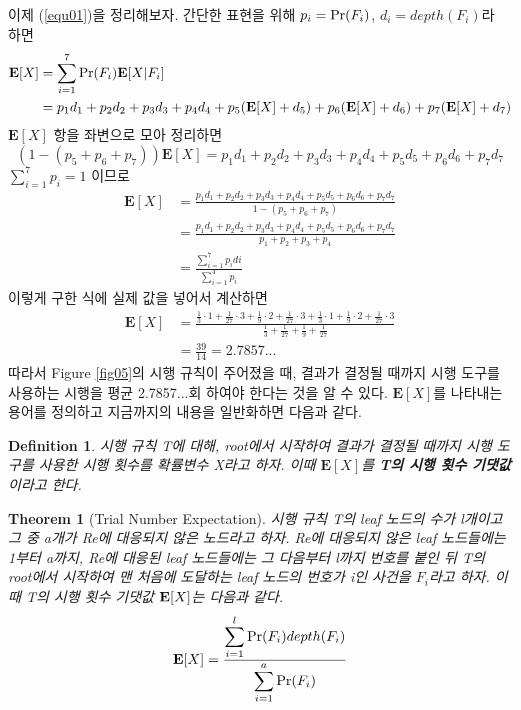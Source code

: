 \documentclass[11pt]{article}
\newtheorem*{definition}{Definition}
\newtheorem{theorem}{Theorem}
\begin{document}
\noindent 이제 (\ref{equ01})을 정리해보자. 간단한 표현을 위해 $p_{i} = \textnormal{Pr}(F_{i})$, $d_{i} = depth(F_{i})$라 하면
\[
\begin{split}
\textbf{E}[X] & = \sum_{i=1}^7 \textnormal{Pr}(F_{i}) \textbf{E}[X|F_{i}]\\
& = p_{1}d_{1} + p_{2}d_{2} + p_{3}d_{3} + p_{4}d_{4} + p_{5}(\textbf{E}[X] + d_{5}) + p_{6}(\textbf{E}[X] + d_{6}) + p_{7}(\textbf{E}[X] + d_{7})
\end{split}
\]
$\textbf{E}[X]$ 항을 좌변으로 모아 정리하면
\[(1 - (p_{5}+p_{6}+p_{7}))\textbf{E}[X] = p_{1}d_{1} + p_{2}d_{2} + p_{3}d_{3} + p_{4}d_{4} + p_{5}d_{5} + p_{6}d_{6} + p_{7}d_{7}\]
\noindent $\displaystyle \sum_{i=1}^7 p_{i} = 1$ 이므로
\[
\begin{split}
\textbf{E}[X] & = \frac{p_{1}d_{1} + p_{2}d_{2} + p_{3}d_{3} + p_{4}d_{4} + p_{5}d_{5} + p_{6}d_{6} + p_{7}d_{7}}{1 - (p_{5}+p_{6}+p_{7})}\\
& = \frac{p_{1}d_{1} + p_{2}d_{2} + p_{3}d_{3} + p_{4}d_{4} + p_{5}d_{5} + p_{6}d_{6} + p_{7}d_{7}}{p_{1}+p_{2}+p_{3}+p_{4}}\\
& = \frac{\displaystyle \sum_{i=1}^{7} p_{i}d{i}}{\displaystyle \sum_{i=1}^{4} p_{i}}
\end{split}
\]
이렇게 구한 식에 실제 값을 넣어서 계산하면
\[
\begin{split}
\textbf{E}[X] & = \frac{\frac{1}{3} \cdot 1 + \frac{1}{27} \cdot 3 + \frac{1}{9} \cdot 2 + \frac{1}{27} \cdot 3 + \frac{1}{3} \cdot 1 + \frac{1}{9} \cdot 2 + \frac{1}{27} \cdot 3}{\frac{1}{3} + \frac{1}{27} + \frac{1}{9} + \frac{1}{27}} \\
& = \frac{39}{14} = 2.7857...
\end{split}
\]
따라서 Figure \ref{fig05}의 시행 규칙이 주어졌을 때, 결과가 결정될 때까지 시행 도구를 사용하는 시행을 평균 2.7857...회 하여야 한다는 것을 알 수 있다. $\textbf{E}[X]$를 나타내는 용어를 정의하고 지금까지의 내용을 일반화하면 다음과 같다.

\singlespacing
\begin{definition}
시행 규칙 T에 대해, root에서 시작하여 결과가 결정될 때까지 시행 도구를 사용한 시행 횟수를 확률변수 X라고 하자. 이때 $\textbf{E}[X]$를 \textbf{T의 시행 횟수 기댓값}이라고 한다.
\end{definition}
\doublespacing

\singlespacing
\begin{theorem}[Trial Number Expectation]
시행 규칙 T의 leaf 노드의 수가 l개이고 그 중 a개가 Re에 대응되지 않은 노드라고 하자. Re에 대응되지 않은 leaf 노드들에는 1부터 a까지, Re에 대응된 leaf 노드들에는 그 다음부터 l까지 번호를 붙인 뒤 T의 root에서 시작하여 맨 처음에 도달하는 leaf 노드의 번호가 i인 사건을 $F_{i}$라고 하자. 이때 T의 시행 횟수 기댓값 $\textnormal{\textbf{E}}[X]$는 다음과 같다.
\[\textnormal{\textbf{E}}[X] = \frac{\displaystyle \sum_{i=1}^{l} \textnormal{Pr}(F_{i})depth(F_{i})}{\displaystyle \sum_{i=1}^{a} \textnormal{Pr}(F_{i})}\]
\label{thm04}
\end{theorem}
\doublespacing
\end{document}
